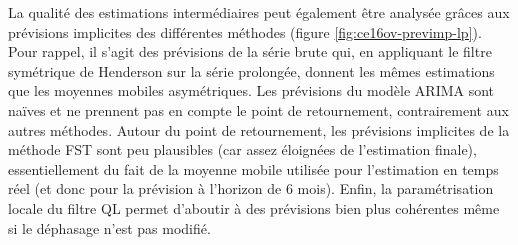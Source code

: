 \documentclass[
  12pt,
  a4paper,french]{article}
\newcommand\1{\mathds{1}}
\begin{document}
La qualité des estimations intermédiaires peut également être analysée grâces aux prévisions implicites des différentes méthodes (figure \ref{fig:ce16ov-previmp-lp}).
Pour rappel, il s'agit des prévisions de la série brute qui, en appliquant le filtre symétrique de Henderson sur la série prolongée, donnent les mêmes estimations que les moyennes mobiles asymétriques.
Les prévisions du modèle ARIMA sont naïves et ne prennent pas en compte le point de retournement, contrairement aux autres méthodes.
Autour du point de retournement, les prévisions implicites de la méthode FST sont peu plausibles (car assez éloignées de l'estimation finale), essentiellement du fait de la moyenne mobile utilisée pour l'estimation en temps réel (et donc pour la prévision à l'horizon de 6 mois).
Enfin, la paramétrisation locale du filtre QL permet d'aboutir à des prévisions bien plus cohérentes même si le déphasage n'est pas modifié.
\end{document}
